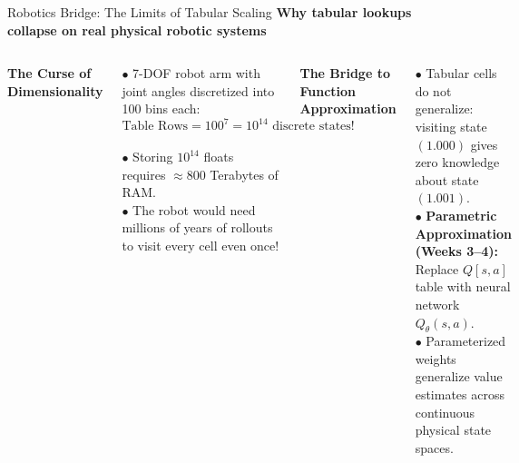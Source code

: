 \documentclass[aspectratio=169,10pt]{beamer}
\newcommand{\sectionlabel}[1]{%
  {\small\bfseries\color{islteal}#1}\par\vspace{0.14cm}%
}
\begin{document}
\begin{frame}{Robotics Bridge: The Limits of Tabular Scaling}
  \sectionlabel{Why tabular lookups collapse on real physical robotic systems}

  \begin{columns}[T,onlytextwidth]
      {\small\bfseries\color{islnavy} The Curse of Dimensionality}\par\vspace{0.08cm}
      {\footnotesize
      $\bullet$ 7-DOF robot arm with joint angles discretized into 100 bins each:\\[2pt]
      $$\text{Table Rows} = 100^7 = 10^{14} \text{ discrete states!}$$\\[2pt]
      $\bullet$ Storing $10^{14}$ floats requires $\approx 800$ Terabytes of RAM.\\[2pt]
      $\bullet$ The robot would need millions of years of rollouts to visit every cell even once!}

      {\small\bfseries\color{islteal} The Bridge to Function Approximation}\par\vspace{0.08cm}
      {\footnotesize
      $\bullet$ Tabular cells do not generalize: visiting state $(1.000)$ gives zero knowledge about state $(1.001)$.\\[2pt]
      $\bullet$ \textbf{Parametric Approximation (Weeks 3--4):} Replace $Q[s, a]$ table with neural network $Q_\theta(s, a)$.\\[2pt]
      $\bullet$ Parameterized weights generalize value estimates across continuous physical state spaces.}
  \end{columns}
\end{frame}
\end{document}
